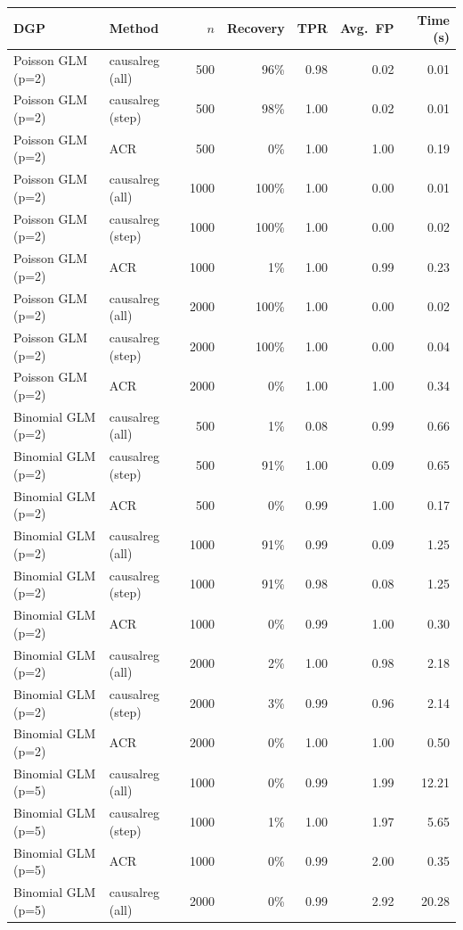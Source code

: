 \begin{tabular}{llrrrrr}
\toprule
DGP & Method & $n$ & Recovery & TPR & Avg.\ FP & Time (s) \\
\midrule
Poisson GLM (p=2) & causalreg (all) & 500 & 96\% & 0.98 & 0.02 & 0.01 \\
Poisson GLM (p=2) & causalreg (step) & 500 & 98\% & 1.00 & 0.02 & 0.01 \\
Poisson GLM (p=2) & ACR & 500 & 0\% & 1.00 & 1.00 & 0.19 \\
Poisson GLM (p=2) & causalreg (all) & 1000 & 100\% & 1.00 & 0.00 & 0.01 \\
Poisson GLM (p=2) & causalreg (step) & 1000 & 100\% & 1.00 & 0.00 & 0.02 \\
Poisson GLM (p=2) & ACR & 1000 & 1\% & 1.00 & 0.99 & 0.23 \\
Poisson GLM (p=2) & causalreg (all) & 2000 & 100\% & 1.00 & 0.00 & 0.02 \\
Poisson GLM (p=2) & causalreg (step) & 2000 & 100\% & 1.00 & 0.00 & 0.04 \\
Poisson GLM (p=2) & ACR & 2000 & 0\% & 1.00 & 1.00 & 0.34 \\
\midrule
Binomial GLM (p=2) & causalreg (all) & 500 & 1\% & 0.08 & 0.99 & 0.66 \\
Binomial GLM (p=2) & causalreg (step) & 500 & 91\% & 1.00 & 0.09 & 0.65 \\
Binomial GLM (p=2) & ACR & 500 & 0\% & 0.99 & 1.00 & 0.17 \\
Binomial GLM (p=2) & causalreg (all) & 1000 & 91\% & 0.99 & 0.09 & 1.25 \\
Binomial GLM (p=2) & causalreg (step) & 1000 & 91\% & 0.98 & 0.08 & 1.25 \\
Binomial GLM (p=2) & ACR & 1000 & 0\% & 0.99 & 1.00 & 0.30 \\
Binomial GLM (p=2) & causalreg (all) & 2000 & 2\% & 1.00 & 0.98 & 2.18 \\
Binomial GLM (p=2) & causalreg (step) & 2000 & 3\% & 0.99 & 0.96 & 2.14 \\
Binomial GLM (p=2) & ACR & 2000 & 0\% & 1.00 & 1.00 & 0.50 \\
\midrule
Binomial GLM (p=5) & causalreg (all) & 1000 & 0\% & 0.99 & 1.99 & 12.21 \\
Binomial GLM (p=5) & causalreg (step) & 1000 & 1\% & 1.00 & 1.97 & 5.65 \\
Binomial GLM (p=5) & ACR & 1000 & 0\% & 0.99 & 2.00 & 0.35 \\
Binomial GLM (p=5) & causalreg (all) & 2000 & 0\% & 0.99 & 2.92 & 20.28 \\

\end{tabular}
